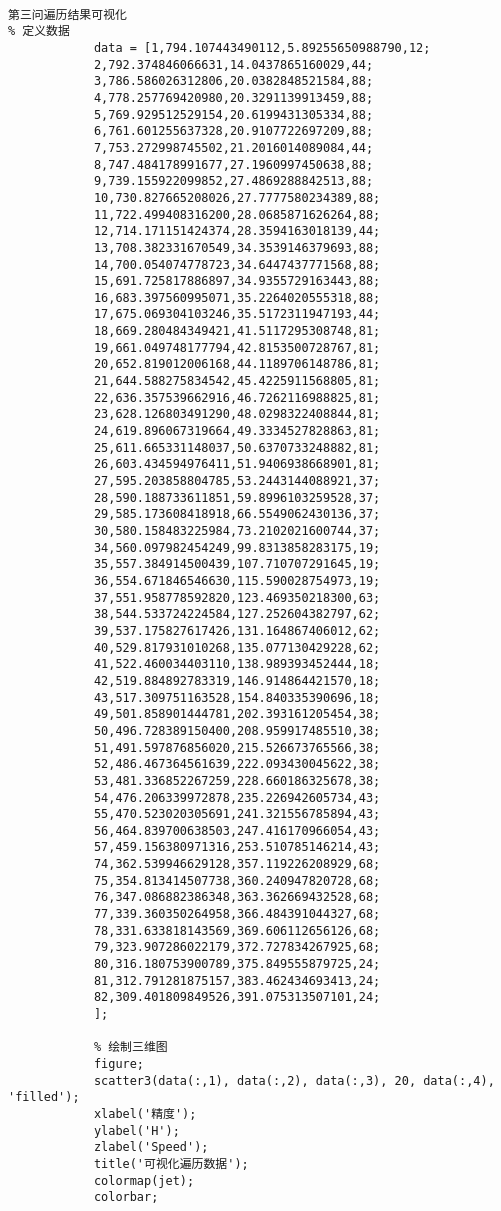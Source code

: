 \documentclass[normalsize]{ctexart}
\begin{document}
\begin{lstlisting}
			
第三问遍历结果可视化
% 定义数据
			data = [1,794.107443490112,5.89255650988790,12;
			2,792.374846066631,14.0437865160029,44;
			3,786.586026312806,20.0382848521584,88;
			4,778.257769420980,20.3291139913459,88;
			5,769.929512529154,20.6199431305334,88;
			6,761.601255637328,20.9107722697209,88;
			7,753.272998745502,21.2016014089084,44;
			8,747.484178991677,27.1960997450638,88;
			9,739.155922099852,27.4869288842513,88;
			10,730.827665208026,27.7777580234389,88;
			11,722.499408316200,28.0685871626264,88;
			12,714.171151424374,28.3594163018139,44;
			13,708.382331670549,34.3539146379693,88;
			14,700.054074778723,34.6447437771568,88;
			15,691.725817886897,34.9355729163443,88;
			16,683.397560995071,35.2264020555318,88;
			17,675.069304103246,35.5172311947193,44;
			18,669.280484349421,41.5117295308748,81;
			19,661.049748177794,42.8153500728767,81;
			20,652.819012006168,44.1189706148786,81;
			21,644.588275834542,45.4225911568805,81;
			22,636.357539662916,46.7262116988825,81;
			23,628.126803491290,48.0298322408844,81;
			24,619.896067319664,49.3334527828863,81;
			25,611.665331148037,50.6370733248882,81;
			26,603.434594976411,51.9406938668901,81;
			27,595.203858804785,53.2443144088921,37;
			28,590.188733611851,59.8996103259528,37;
			29,585.173608418918,66.5549062430136,37;
			30,580.158483225984,73.2102021600744,37;
			34,560.097982454249,99.8313858283175,19;
			35,557.384914500439,107.710707291645,19;
			36,554.671846546630,115.590028754973,19;
			37,551.958778592820,123.469350218300,63;
			38,544.533724224584,127.252604382797,62;
			39,537.175827617426,131.164867406012,62;
			40,529.817931010268,135.077130429228,62;
			41,522.460034403110,138.989393452444,18;
			42,519.884892783319,146.914864421570,18;
			43,517.309751163528,154.840335390696,18;
			49,501.858901444781,202.393161205454,38;
			50,496.728389150400,208.959917485510,38;
			51,491.597876856020,215.526673765566,38;
			52,486.467364561639,222.093430045622,38;
			53,481.336852267259,228.660186325678,38;
			54,476.206339972878,235.226942605734,43;
			55,470.523020305691,241.321556785894,43;
			56,464.839700638503,247.416170966054,43;
			57,459.156380971316,253.510785146214,43;
			74,362.539946629128,357.119226208929,68;
			75,354.813414507738,360.240947820728,68;
			76,347.086882386348,363.362669432528,68;
			77,339.360350264958,366.484391044327,68;
			78,331.633818143569,369.606112656126,68;
			79,323.907286022179,372.727834267925,68;
			80,316.180753900789,375.849555879725,24;
			81,312.791281875157,383.462434693413,24;
			82,309.401809849526,391.075313507101,24;
			];
			
			% 绘制三维图
			figure;
			scatter3(data(:,1), data(:,2), data(:,3), 20, data(:,4), 'filled');
			xlabel('精度');
			ylabel('H');
			zlabel('Speed');
			title('可视化遍历数据');
			colormap(jet);
			colorbar;
			
		\end{lstlisting}
	
	
\end{document}
